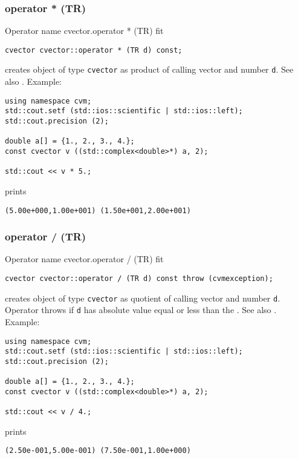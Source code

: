 \subsubsection{operator * (TR)}
Operator%
\pdfdest name {cvector.operator * (TR)} fit
\begin{verbatim}
cvector cvector::operator * (TR d) const;
\end{verbatim}
creates  object of type \verb"cvector" as  product of
 calling vector and  number \verb"d".
See also .
Example:
\begin{Verbatim}
using namespace cvm;
std::cout.setf (std::ios::scientific | std::ios::left);
std::cout.precision (2);

double a[] = {1., 2., 3., 4.};
const cvector v ((std::complex<double>*) a, 2);

std::cout << v * 5.;
\end{Verbatim}
prints
\begin{Verbatim}
(5.00e+000,1.00e+001) (1.50e+001,2.00e+001)
\end{Verbatim}
\newpage



\subsubsection{operator / (TR)}
Operator%
\pdfdest name {cvector.operator / (TR)} fit
\begin{verbatim}
cvector cvector::operator / (TR d) const throw (cvmexception);
\end{verbatim}
creates  object of type \verb"cvector" as  quotient of
 calling vector and  number \verb"d". Operator throws
if \verb"d" has  absolute value equal or less
than the
.
See also .
Example:
\begin{Verbatim}
using namespace cvm;
std::cout.setf (std::ios::scientific | std::ios::left);
std::cout.precision (2);

double a[] = {1., 2., 3., 4.};
const cvector v ((std::complex<double>*) a, 2);

std::cout << v / 4.;
\end{Verbatim}
prints
\begin{Verbatim}
(2.50e-001,5.00e-001) (7.50e-001,1.00e+000)
\end{Verbatim}
\newpage




